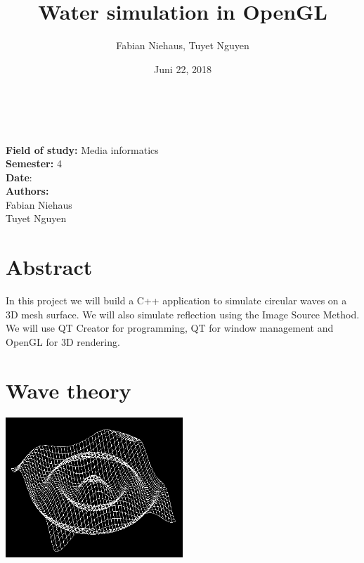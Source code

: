 \documentclass[12pt,a4paper]{scrartcl}
\title{Water simulation in OpenGL}
\author{Fabian Niehaus, Tuyet Nguyen}
\date{Juni 22, 2018}
\begin{document}
\begin{titlepage}
	\centering
	\ \\[2cm]
	{\huge\textbf{\@title}} 
	\\[3cm]
	\large
	\textbf{Field of study:} Media informatics \\
	\textbf{Semester:} 4
	\\[2cm]
	\textbf{Date}: \@date
	\\[2cm]
	\textbf {Authors:}
	\\Fabian Niehaus
	\\Tuyet Nguyen
\end{titlepage}

\newpage
\setcounter{page}{0}
\tableofcontents
\newpage
\listoffigures

\newpage
\ofoot[]{\pagemark}
\normalsize

\section{Abstract}
In this project we will build a C++ application to simulate circular waves on a 3D mesh surface. We will also simulate reflection using the Image Source Method. We will use QT Creator for programming, QT for window management and OpenGL for 3D rendering.



\section{Wave theory}\label{wave-theory}

\begin{center}
	\includegraphics[width=0.5\textwidth]{Images/Concept.jpg}
\end{center} 
\end{document}
